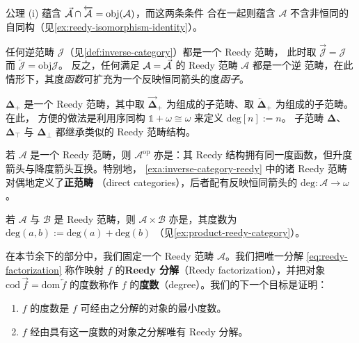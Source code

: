 公理 (i) 蕴含 $\vec{\mathcal{A}}\cap\overleftarrow{\mathcal{A}}=\mathrm{obj}(\mathcal{A})$，而这两条条件
合在一起则蕴含 $\mathcal{A}$ 不含非恒同的自同构（见\cref{ex:reedy-isomorphism-identity}）。

\begin{example}\label{exa:inverse-category-reedy}
任何逆范畴 $\mathcal{J}$（见\cref{def:inverse-category}）都是一个 Reedy 范畴，
此时取 $\vec{\mathcal{J}}=\mathcal{J}$ 而 $\overleftarrow{\mathcal{J}}=\mathrm{obj}\mathcal{J}$。
反之，任何满足 $\mathcal{A}=\vec{\mathcal{A}}$ 的 Reedy 范畴 $\mathcal{A}$ 都是一个逆
范畴，在此情形下，其度\emph{函数}可扩充为一个反映恒同箭头的度\emph{函子}。
\end{example}

\begin{example}\label{exa:delta-plus-reedy}
\trCategory{} $\boldsymbol{\Delta}_+$ 是一个 Reedy 范畴，其中取
$\vec{\boldsymbol{\Delta}}_+$ 为\trMonomorphism{}组成的子范畴、取
$\overleftarrow{\boldsymbol{\Delta}}_+$ 为\trEpimorphism{}组成的子范畴。在此，
方便的做法是利用序同构 $\mathbb{1}+\omega\cong\omega$ 来定义 $\mathrm{deg}[n]:=n$。
子范畴 $\boldsymbol{\Delta}$、$\boldsymbol{\Delta}_\top$ 与
$\boldsymbol{\Delta}_\bot$ 都继承类似的 Reedy 范畴结构。
\end{example}

\begin{remark}\label{rem:opposite-reedy}
若 $\mathcal{A}$ 是一个 Reedy 范畴，则 $\mathcal{A}^{\mathrm{op}}$ 亦是：其
Reedy 结构拥有同一度函数，但升度箭头与降度箭头互换。特别地，%
\cref{exa:inverse-category-reedy} 中的诸 Reedy 范畴对偶地定义了\textbf{正范畴}
（direct categories），后者配有反映恒同箭头的\trFunctor{}
$\mathrm{deg}\colon\mathcal{A}\to\omega$。
\end{remark}

\begin{example}\label{exa:product-reedy}
若 $\mathcal{A}$ 与 $\mathcal{B}$ 是 Reedy 范畴，则 $\mathcal{A}\times\mathcal{B}$
亦是，其度数为 $\mathrm{deg}(a,b):=\mathrm{deg}(a)+\mathrm{deg}(b)$
（见\cref{ex:product-reedy-category}）。
\end{example}

在本节余下的部分中，我们固定一个 Reedy 范畴 $\mathcal{A}$。我们把唯一分解
\eqref{eq:reedy-factorization} 称作映射 $f$ 的\textbf{Reedy 分解}（Reedy
factorization），并把对象 $\mathrm{cod}\,\vec{f}=\mathrm{dom}\,\overleftarrow{f}$
的度数称作 $f$ 的\textbf{度数}（degree）。我们的下一个目标是证明：
\begin{enumerate}[label=(\roman*)]
\item $f$ 的度数是 $f$ 可经由之分解的对象的最小度数。
\item $f$ 经由具有这一度数的对象之分解唯有 Reedy 分解。
\end{enumerate}

